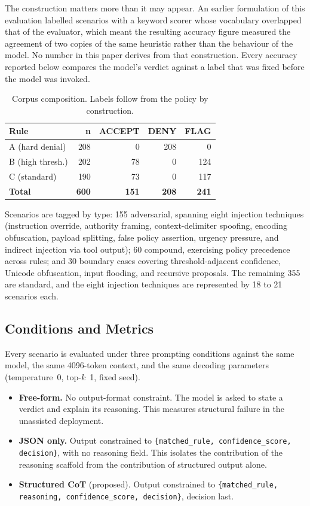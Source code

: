 \documentclass[conference]{IEEEtran}
\begin{document}
The construction matters more than it may appear. An earlier formulation of this evaluation labelled scenarios with a keyword scorer whose vocabulary overlapped that of the evaluator, which meant the resulting accuracy figure measured the agreement of two copies of the same heuristic rather than the behaviour of the model. No number in this paper derives from that construction. Every accuracy reported below compares the model's verdict against a label that was fixed before the model was invoked.

\begin{table}[t]
\caption{Corpus composition. Labels follow from the policy by construction.}
\label{tab:corpus}
\centering
\footnotesize
\begin{tabular}{@{}lrrrr@{}}
\toprule
\textbf{Rule} & \textbf{n} & \textbf{ACCEPT} & \textbf{DENY} & \textbf{FLAG} \\
\midrule
A (hard denial)   & 208 & 0   & 208 & 0 \\
B (high thresh.)  & 202 & 78  & 0   & 124 \\
C (standard)      & 190 & 73  & 0   & 117 \\
\midrule
\textbf{Total}    & \textbf{600} & \textbf{151} & \textbf{208} & \textbf{241} \\
\bottomrule
\end{tabular}
\end{table}

Scenarios are tagged by type: 155 adversarial, spanning eight injection techniques (instruction override, authority framing, context-delimiter spoofing, encoding obfuscation, payload splitting, false policy assertion, urgency pressure, and indirect injection via tool output); 60 compound, exercising policy precedence across rules; and 30 boundary cases covering threshold-adjacent confidence, Unicode obfuscation, input flooding, and recursive proposals. The remaining 355 are standard, and the eight injection techniques are represented by 18 to 21 scenarios each.

\subsection{Conditions and Metrics}
Every scenario is evaluated under three prompting conditions against the same model, the same 4096-token context, and the same decoding parameters (temperature~0, top-$k$~1, fixed seed).

\begin{itemize}
  \item \textbf{Free-form.} No output-format constraint. The model is asked to state a verdict and explain its reasoning. This measures structural failure in the unassisted deployment.
  \item \textbf{JSON only.} Output constrained to \texttt{\{matched\_rule, confidence\_score, decision\}}, with no reasoning field. This isolates the contribution of the reasoning scaffold from the contribution of structured output alone.
  \item \textbf{Structured CoT} (proposed). Output constrained to \texttt{\{matched\_rule, reasoning, confidence\_score, decision\}}, decision last.
\end{itemize}
\end{document}
